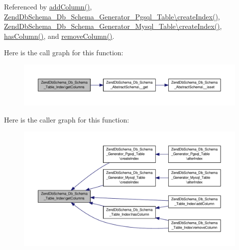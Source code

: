 Referenced by \hyperlink{Db_2Schema_2Table_2Index_8php_source_l00098}{add\-Column()}, \hyperlink{Generator_2Pgsql_2Table_8php_source_l00219}{Zend\-Db\-Schema\-\_\-\-Db\-\_\-\-Schema\-\_\-\-Generator\-\_\-\-Pgsql\-\_\-\-Table\textbackslash{}create\-Index()}, \hyperlink{Generator_2Mysql_2Table_8php_source_l00227}{Zend\-Db\-Schema\-\_\-\-Db\-\_\-\-Schema\-\_\-\-Generator\-\_\-\-Mysql\-\_\-\-Table\textbackslash{}create\-Index()}, \hyperlink{Db_2Schema_2Table_2Index_8php_source_l00087}{has\-Column()}, and \hyperlink{Db_2Schema_2Table_2Index_8php_source_l00125}{remove\-Column()}.



Here is the call graph for this function\-:\nopagebreak
\begin{figure}[H]
\begin{center}
\leavevmode
\includegraphics[width=350pt]{classZendDbSchema__Db__Schema__Table__Index_ad0edf2869c08ce408566798f4305b8dc_cgraph}
\end{center}
\end{figure}




Here is the caller graph for this function\-:\nopagebreak
\begin{figure}[H]
\begin{center}
\leavevmode
\includegraphics[width=350pt]{classZendDbSchema__Db__Schema__Table__Index_ad0edf2869c08ce408566798f4305b8dc_icgraph}
\end{center}
\end{figure}


